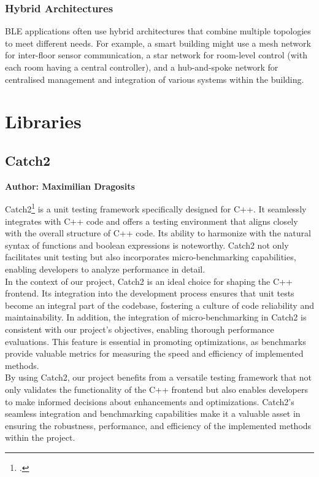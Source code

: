 \subsubsection{Hybrid Architectures}
BLE applications often use hybrid architectures that combine multiple topologies to meet different needs. For example, a smart building might use a mesh network for inter-floor sensor communication, a star network for room-level control (with each room having a central controller), and a hub-and-spoke network for centralised management and integration of various systems within the building.

\section{Libraries}

\subsection{Catch2}
\textbf{Author: Maximilian Dragosits}

Catch2\footcite{catch2_git} is a unit testing framework specifically designed for C++. It seamlessly integrates with C++ code and offers a testing environment 
that aligns closely with the overall structure of C++ code. Its ability to harmonize with the natural syntax of functions and boolean expressions is noteworthy. 
Catch2 not only facilitates unit testing but also incorporates micro-benchmarking capabilities, enabling developers to analyze performance in detail.\\

In the context of our project, Catch2 is an ideal choice for shaping the C++ frontend. Its integration into the development process ensures that unit tests 
become an integral part of the codebase, fostering a culture of code reliability and maintainability. In addition, the integration of micro-benchmarking in Catch2 
is consistent with our project's objectives, enabling thorough performance evaluations. This feature is essential in promoting optimizations, as benchmarks provide 
valuable metrics for measuring the speed and efficiency of implemented methods.\\

By using Catch2, our project benefits from a versatile testing framework that not only validates the functionality of the C++ frontend but also enables developers 
to make informed decisions about enhancements and optimizations. Catch2's seamless integration and benchmarking capabilities make it a valuable asset in ensuring 
the robustness, performance, and efficiency of the implemented methods within the project.

